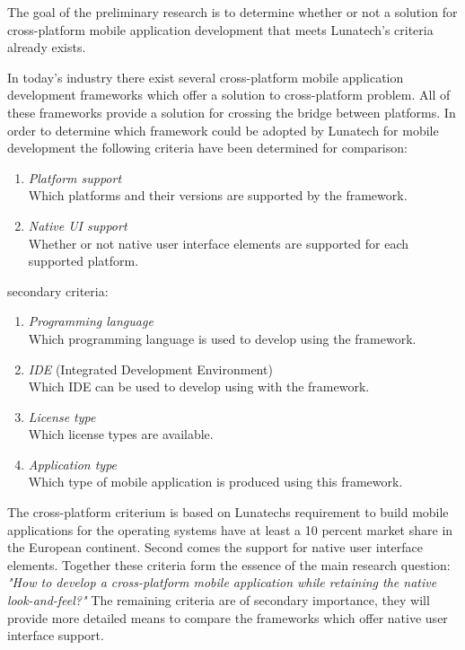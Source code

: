 
The goal of the preliminary research is to determine whether or not a solution for cross-platform mobile application development that meets Lunatech's criteria already exists.

In today's industry there exist several cross-platform mobile application development frameworks which offer a solution to cross-platform problem. All of these frameworks provide a solution for crossing the bridge between platforms. In order to determine which framework could be adopted by Lunatech for mobile development the following criteria have been determined for comparison:

\begin{enumerate}
\item \emph{Platform support}\\
Which platforms and their versions are supported by the framework.
\item \emph{Native UI support}\\
Whether or not native user interface elements are supported for each supported platform.
\end{enumerate}
\noindent secondary criteria:
\begin{enumerate}
\item \emph{Programming language}\\
Which programming language is used to develop using the framework.
\item \emph{IDE} (Integrated Development Environment)\\
Which IDE can be used to develop using with the framework.
\item \emph{License type}\\
Which license types are available.
\item \emph{Application type}\\
Which type of mobile application is produced using this framework.
\end{enumerate}

The cross-platform criterium is based on Lunatechs requirement to build mobile applications for the operating systems have at least a 10 percent market share in the European continent. Second comes the support for native user interface elements. Together these criteria form the essence of the main research question: \emph{"How to develop a cross-platform mobile application while retaining the native look-and-feel?"}
The remaining criteria are of secondary importance, they will provide more detailed means to compare the frameworks which offer native user interface support.


